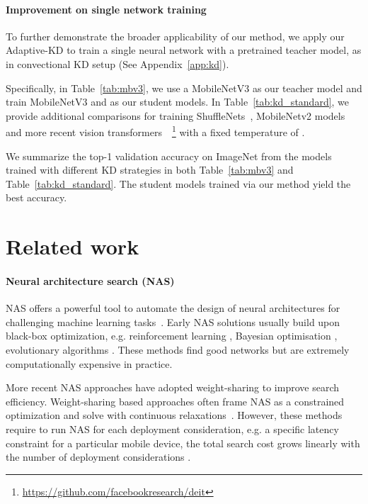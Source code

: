 \documentclass{article}
\begin{document}
\paragraph{Improvement on single network training}
To further demonstrate the broader applicability of our method, 
we apply our Adaptive-KD to train 
a single neural network with a pretrained teacher model, 
as in convectional KD setup (See Appendix~\ref{app:kd}). 

Specifically, in Table~\ref{tab:mbv3}, 
we use a MobileNetV3  \citep{howard2019searching} as our teacher model and 
train MobileNetV3  and   as our student models.  
In Table~\ref{tab:kd_standard}, we provide additional comparisons for training ShuffleNets~\citep{ma2018shufflenet}, MobileNetv2 models~\citep{sandler2018mobilenetv2} and more recent vision transformers~\citep{touvron2020training}~\footnote{\url{https://github.com/facebookresearch/deit}} with a fixed temperature of .

We summarize the top-1 validation accuracy on ImageNet from the models trained with different KD strategies in both Table~\ref{tab:mbv3} and Table~\ref{tab:kd_standard}. 
The student models trained via our method yield the best accuracy.  


 


\section{Related work}

\paragraph{Neural architecture search (NAS)}
NAS offers a powerful tool to automate the design of neural architectures for challenging machine learning tasks~\citep[e.g.,][]{fang2020densely, fu2021cm, moons2020distilling, li2020block, peng2020cream}.
Early NAS solutions usually build upon black-box optimization, e.g. reinforcement learning \citep[e.g.,][]{zoph2016neural}, Bayesian optimisation \citep[e.g.,][]{kandasamy2018neural}, evolutionary algorithms \citep[e.g.,][]{real2019regularized}. These methods find good networks but are extremely computationally expensive in practice.

More recent NAS approaches have adopted weight-sharing \citep{pham2018efficient} to improve search efficiency. 
Weight-sharing based approaches often frame NAS as a constrained optimization and solve with continuous relaxations~\citep[e.g.,][]{liu2018darts, cai2018proxylessnas}. 
However, these methods require to run NAS for each deployment consideration, 
 e.g. a specific latency constraint for a particular mobile device, 
the total search cost grows linearly with the number of deployment considerations  \citep{cai2019once}. 
\end{document}
